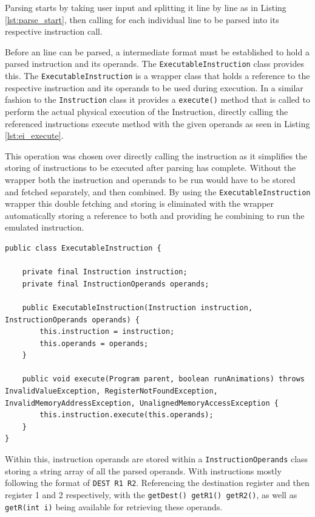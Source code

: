 Parsing starts by taking user input and splitting it line by line as in Listing \ref{lst:parse_start}, then calling for each individual line to be parsed into its respective instruction call.

Before an line can be parsed, a intermediate format must be established to hold a parsed instruction and its operands. The \texttt{ExecutableInstruction} class provides this. The \texttt{ExecutableInstruction} is a wrapper class that holds a reference to the respective instruction and its operands to be used during execution. In a similar fashion to the \texttt{Instruction} class it provides a \verb|execute()| method that is called to perform the actual physical execution of the Instruction, directly calling the referenced instructions execute method with the given operands as seen in Listing \ref{lst:ei_execute}. 

This operation was chosen over directly calling the instruction as it simplifies the storing of instructions to be executed after parsing has complete. Without the wrapper both the instruction and operands to be run would have to be stored and fetched separately, and then combined. By using the \texttt{ExecutableInstruction} wrapper this double fetching and storing is eliminated with the wrapper automatically storing a reference to both and providing he combining to run the emulated instruction.

\begin{lstlisting}[caption=ExecutableInstruction class, label=lst:ei_execute]
public class ExecutableInstruction {

    private final Instruction instruction;
    private final InstructionOperands operands;

    public ExecutableInstruction(Instruction instruction, InstructionOperands operands) {
        this.instruction = instruction;
        this.operands = operands;
    }

    public void execute(Program parent, boolean runAnimations) throws InvalidValueException, RegisterNotFoundException, InvalidMemoryAddressException, UnalignedMemoryAccessException {
        this.instruction.execute(this.operands);
    }
}
\end{lstlisting}

Within this, instruction operands are stored within a \texttt{InstructionOperands} class storing a string array of all the parsed operands. With instructions mostly following the format of \verb|DEST R1 R2|. Referencing the destination register and then register 1 and 2 respectively, with the \verb|getDest() getR1() getR2()|, as well as \verb|getR(int i)| being available for retrieving these operands.

